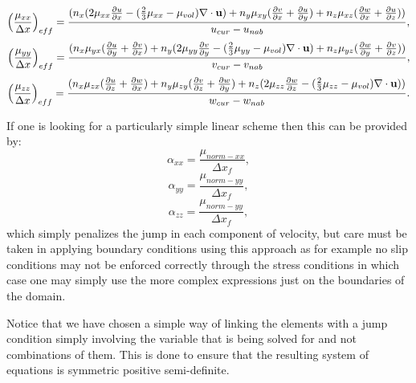 \begin{equation}
\left( \frac{\mu_{xx}}{\Delta x} \right)_{eff}=
\frac{
({n_x} (2\mu_{xx}
\frac{\partial u}{\partial x}
-(\frac{2}{3}\mu_{xx}-\mu_{vol})\nabla\cdot{\bf u}
)
+
 {n_y} \mu_{xy}
(
\frac{\partial v}{\partial x}+\frac{\partial u}{\partial y})
+
{n_z} \mu_{xz}
(
\frac{\partial w}{\partial x}+\frac{\partial u}{\partial z})
 )
}
{ u_{cur}-u_{nab}},
\end{equation}
\begin{equation}
\left( \frac{\mu_{yy}}{\Delta x} \right)_{eff}=
\frac{({n_x} \mu_{yx}
(
\frac{\partial u}{\partial y}+\frac{\partial v}{\partial x}
)
+
{n_y}(2\mu_{yy}
\frac{\partial v}{\partial y}
-(\frac{2}{3}\mu_{yy}-\mu_{vol})\nabla\cdot{\bf u}
)
+
{n_z} \mu_{yz}
(
\frac{\partial w}{\partial y}+\frac{\partial v}{\partial z})
 )
}
{ v_{cur}-v_{nab}},
\end{equation}
\begin{equation}
\left( \frac{\mu_{zz}}{\Delta x} \right)_{eff}=
\frac{({n_x} \mu_{zx}
(
\frac{\partial u}{\partial z}+\frac{\partial w}{\partial x})
+
{n_y} \mu_{zy}
(
\frac{\partial v}{\partial z}+\frac{\partial w}{\partial y})
+
{n_z} (2 \mu_{zz}
\frac{\partial w}{\partial z}
-(\frac{2}{3}\mu_{zz}-\mu_{vol})\nabla\cdot{\bf u}
) )
}
{ w_{cur}-w_{nab}}.
\end{equation}

If one is looking for a particularly simple linear scheme then this can
be provided by:
\begin{equation}
\alpha_{xx}=\frac{\mu_{norm-xx}}{\Delta x_f},
\end{equation}
\begin{equation}
\alpha_{yy}=\frac{\mu_{norm-yy}}{\Delta x_f},
\end{equation}
\begin{equation}
\alpha_{zz}=\frac{\mu_{norm-yy}}{\Delta x_f},
\end{equation}
which simply penalizes the jump in each component of velocity, but care
must be taken in applying boundary conditions using this approach as
for example no slip conditions may not be enforced correctly through the
stress conditions in which case one may simply use the more complex expressions
just on the boundaries of the domain.

Notice that we have chosen a simple way of linking the
elements with a jump condition simply involving the
variable that is being solved for and not combinations
of them. This is done to ensure that the
resulting system of equations is symmetric positive semi-definite.




